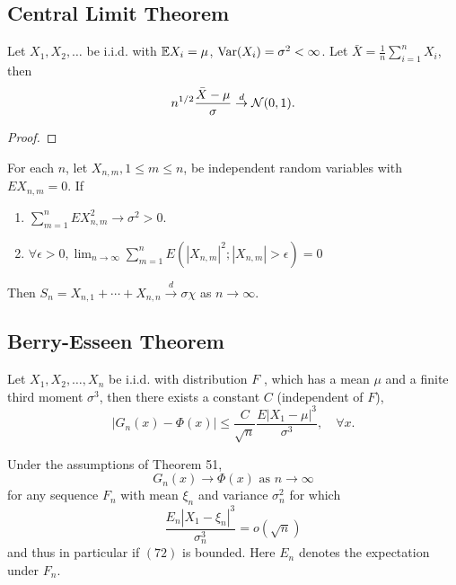 \subsection{Central Limit Theorem}

\begin{theorem}
	\label{thm:classic-central-limit-theorem}
	Let $X_1,X_2,\ldots$ be i.i.d. with ${\mathbb E} X_i=\mu$, $\mathrm{Var}(X_i)=\sigma^2<\infty$. Let $\bar{X}=\frac{1}{n}\sum_{i=1}^{n}X_{i}$, then
	\begin{equation}
		n^{1/2}\frac{\bar{X}-\mu}{\sigma}\stackrel{d}{\rightarrow}{\mathcal N}(0,1).
	\end{equation}
\end{theorem}

\begin{proof}

\end{proof}

\begin{theorem}
	For each $n$, let $X_{n,m},1\leq m\leq n$, be independent random variables with $EX_{n,m}=0$. If
	\begin{enumerate}
		\item $\sum_{m=1}^{n}EX_{n,m}^{2} \rightarrow \sigma^{2}>0$.
		\item $\forall\epsilon>0,\lim_{n\rightarrow\infty}\sum_{m=1}^{n}E\left(\left|X_{n,m}\right|^{2};\left|X_{n,m}\right|>\epsilon\right)=0$
	\end{enumerate}
	Then $S_{n}=X_{n,1}+\cdots+X_{n,n}\stackrel{d}{\rightarrow}\sigma\chi$ as $n\rightarrow\infty$.
\end{theorem}

\subsection{Berry-Esseen Theorem}

\begin{theorem}
	Let $X_{1},X_{2},\ldots,X_{n}$ be i.i.d. with distribution $F$ , which has a mean $\mu$ and a finite third moment $\sigma^{3}$, then there exists a constant $C$ (independent of $F$),
	\begin{equation}
		\left|G_{n}(x)-\Phi(x)\right|\leq\frac{C}{\sqrt{n}}\frac{E\left|X_{1}-\mu\right|^{3}}{\sigma^{3}},\quad\forall x.
	\end{equation}
\end{theorem}

\begin{corollary}
	Under the assumptions of Theorem 51,
	$$
		G_{n}(x) \rightarrow \Phi(x) \text { as } n \rightarrow \infty
	$$
	for any sequence $F_{n}$ with mean $\xi_{n}$ and variance $\sigma_{n}^{2}$ for which
	$$
		\frac{E_{n}\left|X_{1}-\xi_{n}\right|^{3}}{\sigma_{n}^{3}}=o(\sqrt{n})
	$$
	and thus in particular if $(72)$ is bounded. Here $E_{n}$ denotes the expectation under $F_{n}$.
\end{corollary}

